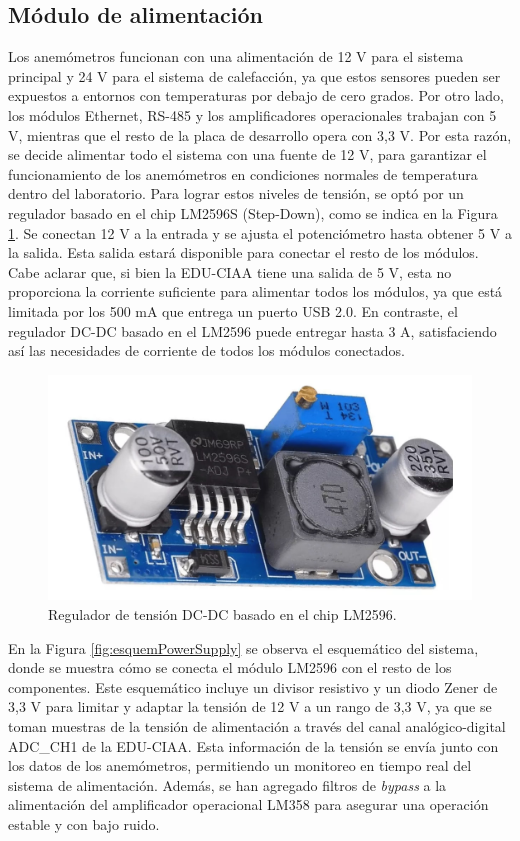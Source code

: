 \subsection{Módulo de alimentación}\label{sec:moduloAlimentacionElectrica}

Los anemómetros funcionan con una alimentación de 12 \unit{\volt} para el sistema principal y 24 \unit{\volt} para el sistema de calefacción, ya que estos sensores pueden ser expuestos a entornos con temperaturas por debajo de cero grados. Por otro lado, los módulos Ethernet, RS-485 y los amplificadores operacionales trabajan con 5 \unit{\volt}, mientras que el resto de la placa de desarrollo opera con 3,3 \unit{\volt}. Por esta razón, se decide alimentar todo el sistema con una fuente de 12 \unit{\volt}, para garantizar el funcionamiento de los anemómetros en condiciones normales de temperatura dentro del laboratorio. Para lograr estos niveles de tensión, se optó por un regulador basado en el chip LM2596S (Step-Down), como se indica en la Figura \ref{fig:StepDowmLM2596S}. Se conectan 12 \unit{\volt} a la entrada y se ajusta el potenciómetro hasta obtener 5 \unit{\volt} a la salida. Esta salida estará disponible para conectar el resto de los módulos. Cabe aclarar que, si bien la EDU-CIAA tiene una salida de 5 \unit{\volt}, esta no proporciona la corriente suficiente para alimentar todos los módulos, ya que está limitada por los 500 \unit{\milli\ampere} que entrega un puerto USB 2.0. En contraste, el regulador DC-DC basado en el LM2596 puede entregar hasta 3 \unit{\ampere}, satisfaciendo así las necesidades de corriente de todos los módulos conectados. 

\begin{figure}[H]
    \centering
    \includegraphics[width=0.5\linewidth]{Figuras/datalogger/Hardware/StepDowmLM2596S.jpg}
    \caption{Regulador de tensión DC-DC basado en el chip LM2596.}
    \label{fig:StepDowmLM2596S}
\end{figure}

En la Figura \ref{fig:esquemPowerSupply} se observa el esquemático del sistema, donde se muestra cómo se conecta el módulo LM2596 con el resto de los componentes. Este esquemático incluye un divisor resistivo y un diodo Zener de 3,3 \unit{\volt} para limitar y adaptar la tensión de 12 \unit{\volt} a un rango de 3,3 \unit{\volt}, ya que se toman muestras de la tensión de alimentación a través del canal analógico-digital ADC\_CH1 de la EDU-CIAA. Esta información de la tensión se envía junto con los datos de los anemómetros, permitiendo un monitoreo en tiempo real del sistema de alimentación. Además, se han agregado filtros de \textit{bypass} a la alimentación del amplificador operacional LM358 para asegurar una operación estable y con bajo ruido.

